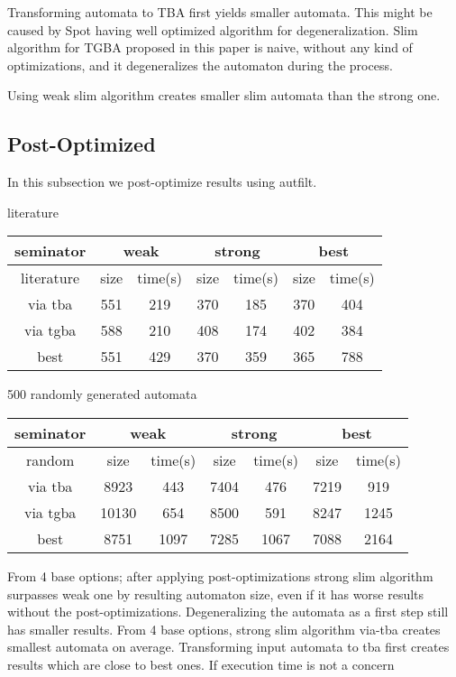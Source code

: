 \documentclass[
	digital
nolof, nolot
]{fithesis3}
\begin{document}
	
	Transforming automata to TBA first yields smaller automata. This might be caused by Spot having well optimized algorithm for degeneralization. Slim algorithm for TGBA proposed in this paper is naive, without any kind of optimizations, and it degeneralizes the automaton during the process.
	
	Using weak slim algorithm creates smaller slim automata than the strong one. 

	\subsection{Post-Optimized}
	In this subsection we post-optimize results using autfilt.
	
	literature
	\begin{center}
		\begin{tabular}{ |c||c|c|c|c|c|c| } 
			\hline
			seminator&\multicolumn{2}{c|}{weak}&\multicolumn{2}{c|}{strong}&\multicolumn{2}{c|}{best} \\
			\hline
			literature&size&time(s)&size&time(s)&size&time(s)\\
			\hhline{|=======|}
			
			via tba&551&219& 370 &185& 370&404\\
			\hline
			via tgba&588&210& 408&174& 402&384\\ 
			\hline
			best&551&429& 370&359& 365&788 \\ 
			\hline
		\end{tabular}
	\end{center}
	
	500 randomly generated automata
	\begin{center}
		\begin{tabular}{ |c|c|c|c|c|c|c| } 
			\hline
			seminator&\multicolumn{2}{c|}{weak}&\multicolumn{2}{c|}{strong}&\multicolumn{2}{c|}{best} \\
			\hline
			random&size&time(s)&size&time(s)&size&time(s)\\
			\hline
			via tba&8923&443& 7404 &476& 7219&919\\
			\hline
			via tgba&10130&654& 8500&591& 8247&1245\\ 
			\hline
			best&8751&1097& 7285&1067& 7088&2164 \\ 
			\hline
		\end{tabular}
	\end{center}
	
	From 4 base options; after applying post-optimizations strong slim algorithm surpasses weak one by resulting automaton size, even if it has worse results without the post-optimizations.
	Degeneralizing the automata as a first step still has smaller results.
	From 4 base options, strong slim algorithm via-tba creates smallest automata on average.
	Transforming input automata to tba first creates results which are close to best ones. If execution time is not a concern
	
\end{document}
